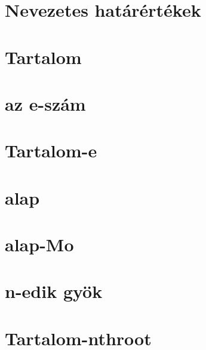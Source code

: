 






\begin{spacing}{1.2}


   \section*{Nevezetes határértékek}

   \section*{Tartalom} \label{Tart}
         \newline
         \newline
      \newpage
      \section*{az e-szám} \label{e}
      \section*{Tartalom-e} \label{Tarte}
         \newline
         \newpage
         \section*{alap} \label{e1}
         \Fa{
            
         }
         \newpage
         \section*{alap-Mo} \label{e1Mo}
         \Mo{
            
         }
         \newpage
      \section*{n-edik gyök} \label{nthroot}
      \section*{Tartalom-nthroot} \label{Tartnthroot}
         \newline
         \newline
         \newline
         \newline
         \newline
         \newpage

\end{spacing}
